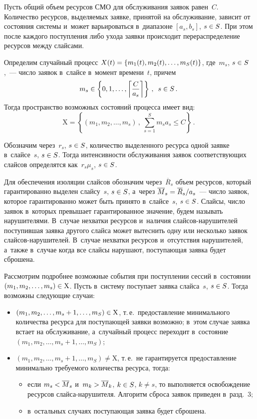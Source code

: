 \begin{multicols}{2}
  Пусть общий объем ресурсов СМО для обслуживания заявок равен~$C$. 
Количество ресурсов, выделяемых заявке, принятой на обслуживание, зависит 
от состояния системы и~может варьироваться в~диапазоне $[a_s, b_s]$, $s\hm\in 
S$. При этом после каж\-до\-го поступления либо ухода заявки происходит 
перераспределение ресурсов между слайсами.
  
  Определим случайный процесс $X(t)\hm= \{ m_1(t), m_2(t), \ldots , m_S(t)\}$, 
где~$m_s$, $s\hm\in S$,~--- число заявок в~слайсе в~момент времени~$t$, 
причем 
  $$
  m_s\in \left\{ 0,1,\ldots , \left\lceil \displaystyle\frac{\displaystyle C\mathstrut}{\displaystyle a_s\mathstrut}\right\rceil \right\}\,,\enskip s\in S\,.
  $$
  Тогда пространство возможных состояний процесса имеет вид:
  $$
  \mathrm{X}=\left\{ \left( m_1, m_2, \ldots , m_s\right)\,,\ \sum\limits^S_{s=1} 
m_s a_s\leq C\right\}\,.
  $$
  
  Обозначим через~$r_s$, $s\hm\in S$, количество выделенного ресурса одной 
заявке в~слайсе~$s$, $s\hm\in S$. Тогда интенсивности обслуживания заявок 
соответствующих слайсов определятся как~$r_s\mu_s$, $s\hm\in S$.
  
  Для обеспечения изоляции слайсов обозначим через~$\overline{R}_s$ объем 
ресурсов, который гарантированно выделен слайсу~$s$, $s\hm\in S$, а~через 
$\overline{M}_s\hm= \overline{R}_s/a_s$~--- число заявок, которое 
гарантированно может быть принято в~слайсе~$s$, $s\hm\in S$. Слайсы, число 
заявок в~которых превышает гарантированное значение, будем называть 
нарушителями. В~случае нехватки ресурсов и~наличия  
слай\-сов-на\-ру\-ши\-те\-лей поступившая заявка другого слайса может 
вытеснить одну или несколько заявок слай\-сов-на\-ру\-ши\-те\-лей. В~случае 
нехватки ресурсов и~отсутствия нарушителей, а~также в~случае когда все 
слайсы нарушают, поступающая заявка будет сброшена.
  
  Рассмотрим подробнее возможные события при поступлении сессий 
в~состоянии $(m_1, m_2, \ldots , m_s)\hm\in \mathrm{X}$. Пусть в~систему 
поступает заявка слайса~$s$, $s\hm\in S$. Тогда возможны следующие случаи:
  \begin{itemize}
  \item $(m_1, m_2, \ldots , m_s+1, \ldots , m_S)\hm\in \mathrm{X}$, т.\,е.\ 
предо\-став\-ле\-ние минимального количества ресурса для поступающей заявки 
возможно; в~этом случае заявка встает на обслуживание, а~случайный процесс 
переходит в~состояние  $(m_1, m_2, \ldots , m_s+1,\ldots , m_S)$;
  \item  $(m_1, m_2, \ldots , m_s+1, \ldots , m_S)\not= \mathrm{X}$, т.\,е.\ не 
гарантируется предоставление минимально тре\-бу\-емо\-го количества ресурса, 
тогда:
\begin{itemize}
  \item  если $m_s\hm< \overline{M}_s$ и~$m_k\hm> \overline{M}_k$, $k\hm\in S$, $k\not= 
s$, то выполняется освобождение ресурсов слай\-са-на\-ру\-ши\-те\-ля. 
Алгоритм сброса заявок приведен в~разд.~3;
  \item  в~остальных случаях поступающая заявка будет сброшена.
  \end{itemize}
  \end{itemize}
  

\end{multicols}
